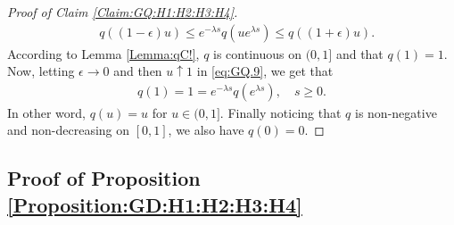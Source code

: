 \documentclass[12pt,a4paper]{amsart}
\numberwithin{equation}{section}
\theoremstyle{plain}
\theoremstyle{definition}
\theoremstyle{remark}
\newcounter{N}
\newcounter{n}[N]
\begin{document}
\begin{proof}[Proof of Claim \ref{Claim:GQ:H1:H2:H3:H4}]
\begin{align} 
\label{eq:GQ.9}
& q((1-\epsilon)u)
\leq e^{-\lambda s}q(u e^{\lambda s}) 
\leq q((1+\epsilon)u). 
\end{align}
According to Lemma \ref{Lemma:qC!}, $q$ is continuous on $(0,1]$ and that $q(1)= 1$.
Now, letting $\epsilon \to 0$ and then $u \uparrow 1$ in \eqref{eq:GQ.9}, we get that 
\begin{align} 
q(1) 
=1
= e^{- \lambda s} q(e^{\lambda s}), 
\quad s \geq 0. 
\end{align} 
In other word, $q(u) = u$ for $u\in (0,1]$.
Finally noticing that $q$ is non-negative and non-decreasing on $[0,1]$, we also have $q(0) = 0$.
\end{proof}
\subsection{Proof of Proposition \ref{Proposition:GD:H1:H2:H3:H4}}
\end{document}
